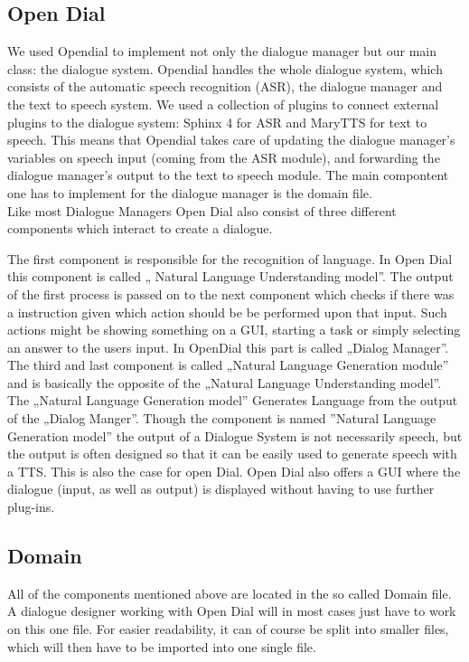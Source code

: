 \subsection{Open Dial}

We used Opendial to implement not only the dialogue manager but our main class: the dialogue system. Opendial handles the whole dialogue system, which consists of the automatic speech recognition (ASR), the dialogue manager and the text to speech system. We used a collection of plugins to connect external plugins to the dialogue system: Sphinx 4 for ASR and MaryTTS for text to speech. This means that Opendial takes care of updating the dialogue manager's variables on speech input (coming from the ASR module), and forwarding the dialogue manager's output to the text to speech module. The main compontent one has to implement for the dialogue manager is the domain file. \\

Like most Dialogue Managers Open Dial also consist of three different components which interact to create a dialogue. 

The first component is responsible for the recognition of language. 
In Open Dial this component is called „ Natural Language Understanding model”. 
The output of the first process is passed on to the next component which checks if there was a instruction given which action should be  be performed upon that input. 
Such actions might be showing something on a GUI, starting a task or simply selecting an answer to the users input. 
In OpenDial this part is called „Dialog Manager”.
The third and last component is called „Natural Language Generation module” and is basically the opposite of the „Natural Language Understanding model”. 
The „Natural Language Generation model” Generates Language from the output of the „Dialog Manger”. 
Though the component is named ”Natural Language Generation model” the output of a Dialogue System is not necessarily speech, but the output is often designed so that it can be easily used to generate speech with a TTS. 
This is also the case for open Dial. 
Open Dial also offers a GUI where the dialogue (input, as well as output) is displayed without having to use further plug-ins.

\subsection{Domain}

All of the components mentioned above are located in the so called Domain file.
A dialogue designer working with Open Dial will in most cases just have to work on this one file. For easier readability, it can of course be split into smaller files, which will then have to be imported into one single file. \newline

